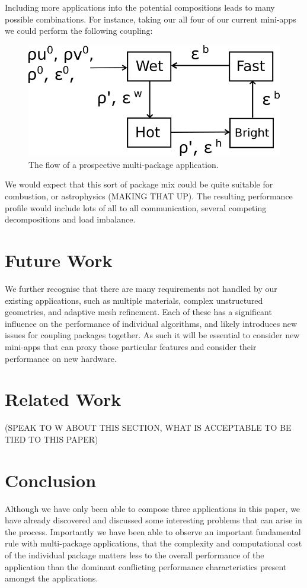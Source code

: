 \documentclass[runningheads,a4paper]{llncs}
\begin{document}
Including more applications into the potential compositions leads to many possible combinations. For instance, taking our all four of our current mini-apps we could perform the following coupling:

\begin{figure}
  \centering
  \includegraphics[width=0.6\linewidth]{all-four-flow}
  \caption{The flow of a prospective multi-package application.}
  \label{fig:multi-package-flow}
\end{figure}

We would expect that this sort of package mix could be quite suitable for combustion, or astrophysics (MAKING THAT UP). The resulting performance profile would include lots of all to all communication, several competing decompositions and load imbalance.

\section{Future Work}

We further recognise that there are many requirements not handled by our existing applications, such as multiple materials, complex unstructured geometries, and adaptive mesh refinement. Each of these has a significant influence on the performance of individual algorithms, and likely introduces new issues for coupling packages together. As such it will be essential to consider new mini-apps that can proxy those particular features and consider their performance on new hardware.

\section{Related Work}

(SPEAK TO W ABOUT THIS SECTION, WHAT IS ACCEPTABLE TO BE TIED TO THIS PAPER)

\section{Conclusion}

Although we have only been able to compose three applications in this paper, we have already discovered and discussed some interesting problems that can arise in the process. Importantly we have been able to observe an important fundamental rule with multi-package applications, that the complexity and computational cost of the individual package matters less to the overall performance of the application than the dominant conflicting performance characteristics present amongst the applications.



\end{document}
